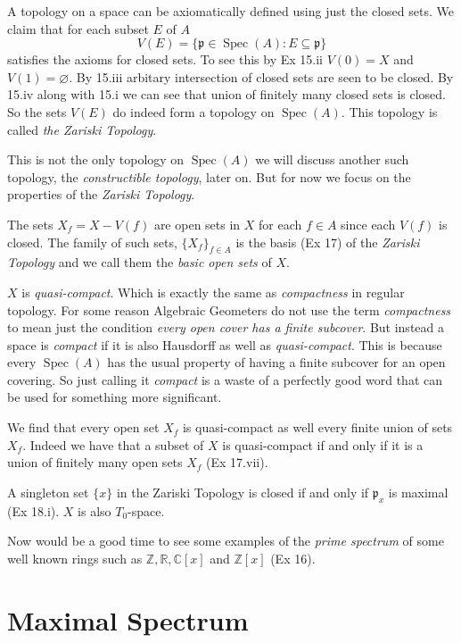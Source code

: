 \documentclass[]{report}
\DeclareMathOperator\Spec{Spec}
\begin{document}
A topology on a space can be axiomatically defined using just the closed sets. We claim that for each subset $E$ of $A$
    $$V(E) = \{\mathfrak{p}\in \Spec(A): E\subseteq \mathfrak{p}\}$$
    satisfies the axioms for closed sets. To see this by Ex 15.ii $V(0) = X$ and $V(1) = \varnothing$. By 15.iii arbitary intersection of closed sets are seen to be closed. By 15.iv along with 15.i we can see that union of finitely many closed sets is closed. So the sets $V(E)$ do indeed form a topology on $\Spec(A)$. This topology is called \textit{the Zariski Topology}.

    This is not the only topology on $\Spec(A)$ we will discuss another such topology, the \textit{constructible topology}, later on. But for now we focus on the properties of the \textit{Zariski Topology}.

    The sets $X_f = X - V(f)$ are open sets in $X$ for each $f\in A$ since each $V(f)$ is closed. The family of such sets, $\{X_f\}_{f\in A}$ is the basis (Ex 17) of the \textit{Zariski Topology} and we call them the \textit{basic open sets} of $X$.

    $X$ is \textit{quasi-compact}. Which is exactly the same as \textit{compactness} in regular topology. For some reason Algebraic Geometers do not use the term \textit{compactness} to mean just the condition \textit{every open cover has a finite subcover}. But instead a space is \textit{compact} if it is also Hausdorff as well as \textit{quasi-compact}. This is because every $\Spec(A)$ has the usual property of having a finite subcover for an open covering. So just calling it \textit{compact} is a waste of a perfectly good word that can be used for something more significant. 

    We find that every open set $X_f$ is quasi-compact as well every finite union of sets $X_f$. Indeed we have that a subset of $X$ is quasi-compact if and only if it is a union of finitely many open sets $X_f$ (Ex 17.vii).

    A singleton set $\{x\}$ in the Zariski Topology is closed if and only if $\mathfrak{p}_x$ is maximal (Ex 18.i). $X$ is also $T_0$-space.

    Now would be a good time to see some examples of the \textit{prime spectrum} of some well known rings such as $\mathbb{Z, R, C}[x]$ and $\mathbb{Z}[x]$ (Ex 16).



\section{Maximal Spectrum}
\end{document}
